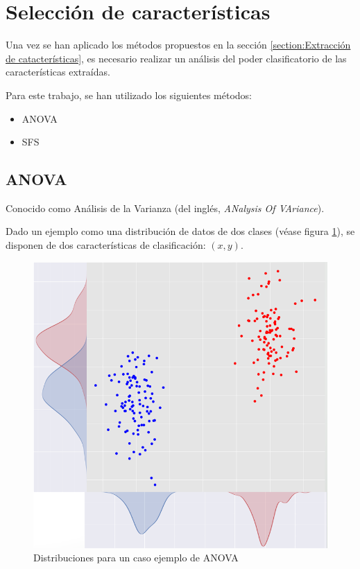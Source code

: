
\section{Selección de características}

Una vez se han aplicado los métodos propuestos en la sección \ref{section:Extracción de catacterísticas}, es necesario realizar un análisis del poder clasificatorio de las características extraídas.

Para este trabajo, se han utilizado los siguientes métodos:
\begin{itemize}
	\item ANOVA
	\item SFS
\end{itemize}

\subsection{ANOVA}



Conocido como Análisis de la Varianza (del inglés, \textit{ANalysis Of VAriance}).

Dado un ejemplo como una distribución de datos de dos clases (véase figura \ref{ANOVA:distribucion_ejemplo}), se disponen de dos características de clasificación: $(x,y)$.

\begin{figure}[h]
	\centering
	\captionsetup{justification=centering}
	\includegraphics[scale = 0.5]{imagenes/marco_teorico/ANOVA/ejemplo_distribuciones.png}
	\caption{Distribuciones para un caso ejemplo de ANOVA}
	\label{ANOVA:distribucion_ejemplo}
\end{figure}

